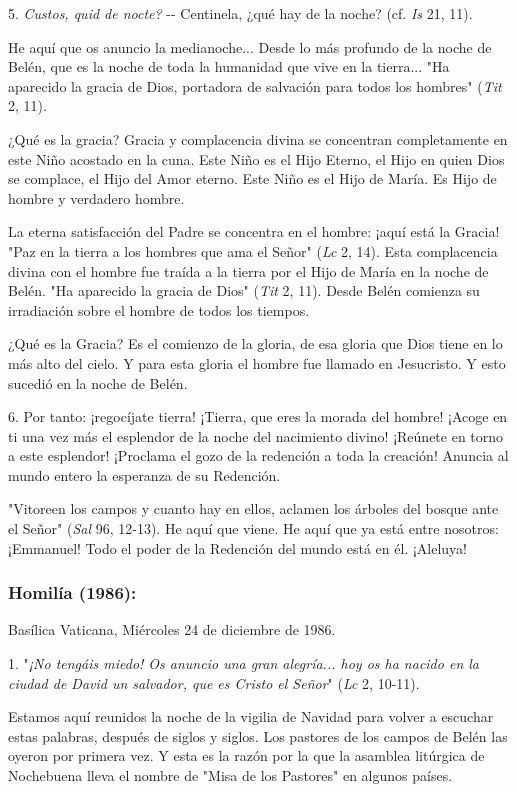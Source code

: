 5. \emph{Custos, quid de nocte?} -\/- Centinela, ¿qué hay de la noche?
(cf. \emph{Is} 21, 11).

He aquí que os anuncio la medianoche... Desde lo más profundo de la
noche de Belén, que es la noche de toda la humanidad que vive en la
tierra... "Ha aparecido la gracia de Dios, portadora de salvación para
todos los hombres" (\emph{Tit} 2, 11).

¿Qué es la gracia? Gracia y complacencia divina se concentran
completamente en este Niño acostado en la cuna. Este Niño es el Hijo
Eterno, el Hijo en quien Dios se complace, el Hijo del Amor eterno. Este
Niño es el Hijo de María. Es Hijo de hombre y verdadero hombre.

La eterna satisfacción del Padre se concentra en el hombre: ¡aquí está
la Gracia! "Paz en la tierra a los hombres que ama el Señor" (\emph{Lc}
2, 14). Esta complacencia divina con el hombre fue traída a la tierra
por el Hijo de María en la noche de Belén. "Ha aparecido la gracia de
Dios" (\emph{Tit} 2, 11). Desde Belén comienza su irradiación sobre el
hombre de todos los tiempos.

¿Qué es la Gracia? Es el comienzo de la gloria, de esa gloria que Dios
tiene en lo más alto del cielo. Y para esta gloria el hombre fue llamado
en Jesucristo. Y esto sucedió en la noche de Belén.

6. Por tanto: ¡regocíjate tierra! ¡Tierra, que eres la morada del
hombre! ¡Acoge en ti una vez más el esplendor de la noche del nacimiento
divino! ¡Reúnete en torno a este esplendor! ¡Proclama el gozo de la
redención a toda la creación! Anuncia al mundo entero la esperanza de su
Redención.

"Vitoreen los campos y cuanto hay en ellos, aclamen los árboles del
bosque ante el Señor" (\emph{Sal} 96, 12-13). He aquí que viene. He aquí
que ya está entre nosotros: ¡Emmanuel! Todo el poder de la Redención del
mundo está en él. ¡Aleluya!

\subsubsection{Homilía (1986): }

Basílica Vaticana, Miércoles 24 de diciembre de 1986.

1. "\emph{¡No tengáis miedo! Os anuncio una gran alegría... hoy os ha
	nacido en la ciudad de David un salvador, que es Cristo el Señor}"
(\emph{Lc} 2, 10-11).

Estamos aquí reunidos la noche de la vigilia de Navidad para volver a
escuchar estas palabras, después de siglos y siglos. Los pastores de los
campos de Belén las oyeron por primera vez. Y esta es la razón por la
que la asamblea litúrgica de Nochebuena lleva el nombre de "Misa de los
Pastores" en algunos países.

